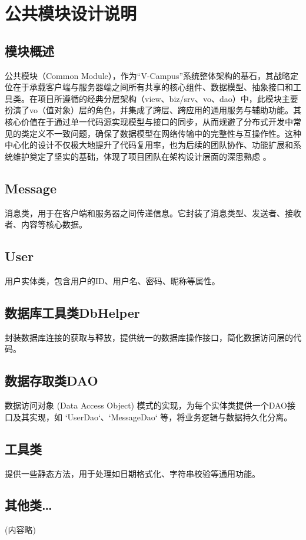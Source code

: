 \documentclass[a4paper]{ctexart}
\begin{document}
\section{公共模块设计说明}
\subsection{模块概述}
公共模块（Common Module），作为“V-Campus”系统整体架构的基石，其战略定位在于承载客户端与服务器端之间所有共享的核心组件、数据模型、抽象接口和工具类。在项目所遵循的经典分层架构（view、biz/srv、vo、dao）中，此模块主要扮演了vo（值对象）层的角色，并集成了跨层、跨应用的通用服务与辅助功能。其核心价值在于通过单一代码源实现模型与接口的同步，从而规避了分布式开发中常见的类定义不一致问题，确保了数据模型在网络传输中的完整性与互操作性。这种中心化的设计不仅极大地提升了代码复用率，也为后续的团队协作、功能扩展和系统维护奠定了坚实的基础，体现了项目团队在架构设计层面的深思熟虑 。
\subsection{Message}
消息类，用于在客户端和服务器之间传递信息。它封装了消息类型、发送者、接收者、内容等核心数据。

\subsection{User}
用户实体类，包含用户的ID、用户名、密码、昵称等属性。

\subsection{数据库工具类DbHelper}
封装数据库连接的获取与释放，提供统一的数据库操作接口，简化数据访问层的代码。

\subsection{数据存取类DAO}
数据访问对象 (Data Access Object) 模式的实现，为每个实体类提供一个DAO接口及其实现，如 `UserDao`、`MessageDao` 等，将业务逻辑与数据持久化分离。

\subsection{工具类}
提供一些静态方法，用于处理如日期格式化、字符串校验等通用功能。

\subsection{其他类…}
(内容略)
\end{document}
